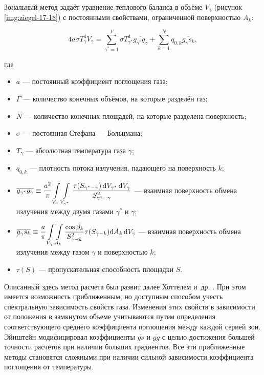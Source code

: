 Зональный метод задаёт уравнение теплового баланса в объёме $V_\gamma$ (рисунок \ref{img:ziegel-17-18}) с постоянными свойствами, ограниченной поверхностью $A_k$:

\begin{equation}
	4a\sigma T^4_\gamma V_\gamma = \sum_{\gamma^* = 1}^{\Gamma} \sigma T^4_{\gamma^*} \overline{g_{\gamma^*} g_\gamma} + \sum_{k=1}^{N} q_{0, k} \overline{g_\gamma s_k},
\end{equation}

\noindent где
\begin{itemize}
	\item $a$ — постоянный коэффициент поглощения газа;
	\item $\Gamma$ — количество конечных объёмов, на которые разделён газ;
	\item $N$ — количество конечных площадей, на которые разделена поверхность;
	\item $\sigma$ — постоянная Стефана — Больцмана;
	\item $T_\gamma$ — абсолютная температура газа $\gamma$;
	\item $q_{0, k}$ — плотность потока излучения, падающего на поверхность $k$;
	\item $\displaystyle \overline{g_{\gamma^*} g_\gamma} \equiv \frac{a^2}{\pi} \int\displaylimits_{V_\gamma} \int\displaylimits_{V_{\gamma^*}} \frac{\tau(S_{\gamma^*-\gamma}) \,\mathrm dV_{\gamma^*} \,\mathrm dV_\gamma}{S^2_{\gamma^*-\gamma}}$ — взаимная поверхность обмена излучения между двумя газами $\gamma^*$ и $\gamma$;
	\item $\displaystyle \overline{g_\gamma s_k} \equiv \frac a\pi  \int\displaylimits_{V_\gamma} \int\displaylimits_{A_k} \frac{\cos{\beta_k}}{S^2_{\gamma-k}} \tau (S_{\gamma - k}) \mathrm dA_k \, \mathrm dV_\gamma$ — взаимная поверхность обмена излучения между газом $\gamma$ и поверхностью $k$;
	\item $\tau(S)$ — пропускательная способность площадки $S$.
\end{itemize}


Описанный здесь метод расчета был развит далее Хоттелем
и~др. \cite{hottel-1, hottel-2}. При этом имеется возможность приближенным,
но доступным способом учесть спектральную зависимость свойств
газа. Изменения этих свойств в зависимости от положения в
замкнутом объеме учитываются путем определения соответствующего
среднего коэффициента поглощения между каждой серией зон.
Эйнштейн \cite{einstein-1, einstein-2} модифицировал коэффициенты $\overline{gs}$ и $\overline{gg}$ с целью
достижения большей точности расчетов при наличии больших
градиентов. Все эти приближенные методы становятся сложными
при наличии сильной зависимости коэффициента поглощения
от температуры.


